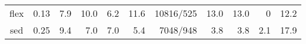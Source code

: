 \begin{table*}[htbp]
{\begin{tabular}{|c|r|r|r|r|r|r|r|r|r|r|}
flex                     & 0.13                                                                                                & 7.9      & 10.0      & 6.2      & 11.6    & 10816/525                                                                                                        & 13.0       & 13.0       & 0          & 12.2        \\ %
sed                      & 0.25                                                                                                & 9.4      & 7.0      & 7.0      & 5.4     & 7048/948                                                                                                         & 3.8        & 3.8        & 2.1          & 17.9       \\ \hline
\end{tabular}
}
\end{table*}

